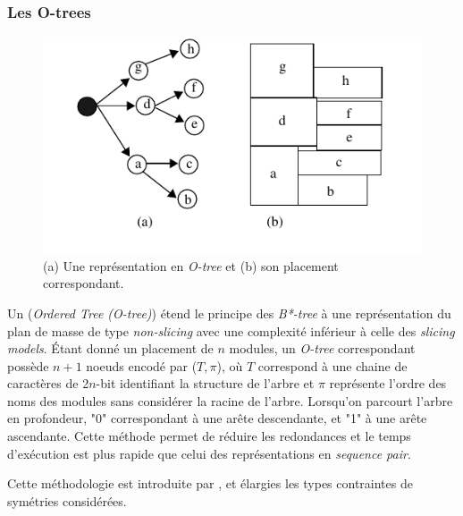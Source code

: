 \subsubsection{Les O-trees}
\begin{figure}[h]
\begin{center}
  \includegraphics[height=0.24\textheight]{Figures/5.pdf}
  \caption{(a) Une représentation en {\it O-tree} et (b) son placement correspondant.}
\label{fig:5}
\end{center}
\end{figure}
Un ({\it Ordered Tree (O-tree)}) étend le principe des {\it B*-tree}  à une représentation du plan de masse de type {\it non-slicing} avec une complexité inférieur à celle des {\it slicing models}. \'Etant donné un placement de $n$ modules, un {\it O-tree} correspondant possède $n+1$ noeuds encodé par ($T,\pi$), o\`u $T$ correspond à une chaine de caractères de 2$n$-bit identifiant la structure de l'arbre et $\pi$ représente l'ordre des noms des modules sans considérer la racine de l'arbre. Lorsqu'on parcourt l'arbre en profondeur, "0" correspondant à une arête descendante, et "1" à une arête ascendante. Cette méthode permet de réduire les redondances et le temps d'exécution est plus rapide que celui des représentations en {\it sequence pair}. \newline

Cette méthodologie est introduite par \cite{Guo1999}, \cite{FlorinBalasa2000} et \cite{LinfuXiao2009} élargies les types contraintes de symétries considérées.

